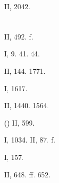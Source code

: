  II, 2042.

\section{}

 II, 492. f.

 I, 9. 41. 44.

 II, 144. 1771.

 I, 1617.

 II, 1440. 1564.

 () II, 599.

 I, 1034. II, 87. f.

 I, 157.

 II, 648. ff. 652.
